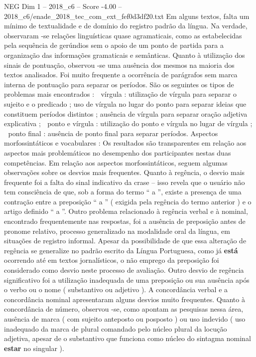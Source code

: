 \begin{textsample}{NEG Dim 1 – 2018\_c6 – Score -4.00 – 2018\_c6/enade\_2018\_tec\_com\_ext\_fef0d3df20.txt}
Em alguns textos, falta um mínimo de textualidade e de domínio do registro padrão da língua.
Na verdade, observaram -se relações linguísticas quase agramaticais, como as estabelecidas pela sequência de gerúndios sem o apoio de um ponto de partida para a organização das informações gramaticais e semânticas.
Quanto à utilização dos sinais de pontuação, observou -se uma ausência dos mesmos na maioria dos textos analisados.
Foi muito frequente a ocorrência de parágrafos sem marca interna de pontuação para separar os períodos.
São os seguintes os tipos de problemas mais encontrados :  vírgula : utilização de vírgula para separar o sujeito e o predicado ; uso de vírgula no lugar do ponto para separar ideias que constituem períodos distintos ; ausência de vírgula para separar oração adjetiva explicativa ;  ponto e vírgula : utilização do ponto e vírgula no lugar de vírgula ;  ponto final : ausência de ponto final para separar períodos.
Aspectos morfossintáticos e vocabulares : Os resultados são transparentes em relação aos aspectos mais problemáticos no desempenho dos participantes nestas duas competências.
Em relação aos aspectos morfossintáticos, seguem algumas observações sobre os desvios mais frequentes.
Quanto à regência, o desvio mais frequente foi a falta do sinal indicativo da crase – isso revela que o usuário não tem consciência de que, sob a forma do termo “ a ”, existe a presença de uma contração entre a preposição “ a ” ( exigida pela regência do termo anterior ) e o artigo definido “ a ”.
Outro problema relacionado à regência verbal e à nominal, encontrado frequentemente nas respostas, foi a ausência de preposição antes de pronome relativo, processo generalizado na modalidade oral da língua, em situações de registro informal.
Apesar da possibilidade de que essa alteração de regência se generalize no padrão escrito da Língua Portuguesa, como já \textbf{está} ocorrendo até em textos jornalísticos, o não emprego da preposição foi considerado como desvio neste processo de avaliação.
Outro desvio de regência significativo foi a utilização inadequada de uma preposição ou sua ausência após o verbo ou o nome ( substantivo ou adjetivo ).
A concordância verbal e a concordância nominal apresentaram alguns desvios muito frequentes.
Quanto à concordância de número, observou -se, como apontam as pesquisas nessa área, ausência de marca ( com sujeito anteposto ou posposto ) ou uso indevido ( uso inadequado da marca de plural comandado pelo núcleo plural da locução adjetiva, apesar de o substantivo que funciona como núcleo do sintagma nominal \textbf{estar} no singular ).

\end{textsample}
